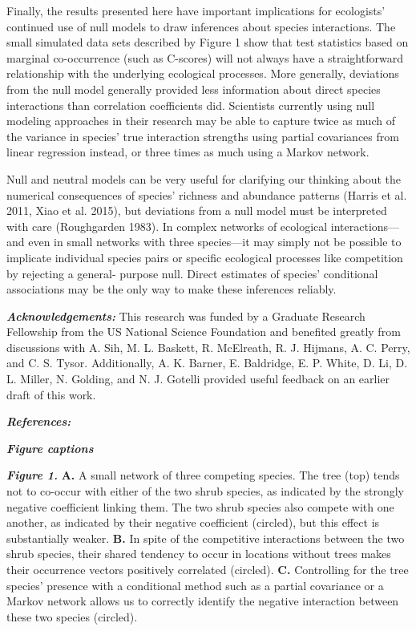 \documentclass[12pt,]{article}
\begin{document}
\begin{spacing}{1.9}
\begin{flushleft}
Finally, the results presented here have important implications for
ecologists' continued use of null models to draw inferences about
species interactions. The small simulated data sets described by Figure
1 show that test statistics based on marginal co-occurrence (such as
C-scores) will not always have a straightforward relationship with the
underlying ecological processes. More generally, deviations from the
null model generally provided less information about direct species
interactions than correlation coefficients did. Scientists currently
using null modeling approaches in their research may be able to capture
twice as much of the variance in species' true interaction strengths
using partial covariances from linear regression instead, or three times
as much using a Markov network.

Null and neutral models can be very useful for clarifying our thinking
about the numerical consequences of species' richness and abundance
patterns (Harris et al. 2011, Xiao et al. 2015), but deviations from a
null model must be interpreted with care (Roughgarden 1983). In complex
networks of ecological interactions---and even in small networks with
three species---it may simply not be possible to implicate individual
species pairs or specific ecological processes like competition by
rejecting a general- purpose null. Direct estimates of species'
conditional associations may be the only way to make these inferences
reliably.

\textbf{\emph{Acknowledgements:}} This research was funded by a Graduate
Research Fellowship from the US National Science Foundation and
benefited greatly from discussions with A. Sih, M. L. Baskett, R.
McElreath, R. J. Hijmans, A. C. Perry, and C. S. Tysor. Additionally, A.
K. Barner, E. Baldridge, E. P. White, D. Li, D. L. Miller, N. Golding,
and N. J. Gotelli provided useful feedback on an earlier draft of this
work.

\textbf{\emph{References:}}

\textbf{\emph{Figure captions}}

\textbf{\emph{Figure 1.}} \textbf{A.} A small network of three competing
species. The tree (top) tends not to co-occur with either of the two
shrub species, as indicated by the strongly negative coefficient linking
them. The two shrub species also compete with one another, as indicated
by their negative coefficient (circled), but this effect is
substantially weaker. \textbf{B.} In spite of the competitive
interactions between the two shrub species, their shared tendency to
occur in locations without trees makes their occurrence vectors
positively correlated (circled). \textbf{C.} Controlling for the tree
species' presence with a conditional method such as a partial covariance
or a Markov network allows us to correctly identify the negative
interaction between these two species (circled).


\end{flushleft}
\end{spacing}
\end{document}
